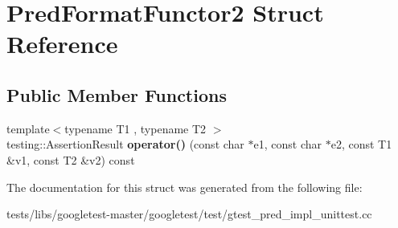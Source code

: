 \hypertarget{structPredFormatFunctor2}{}\section{Pred\+Format\+Functor2 Struct Reference}
\label{structPredFormatFunctor2}
\subsection*{Public Member Functions}
\begin{DoxyCompactItemize}
\item 
\mbox{\label{structPredFormatFunctor2_a0169e0105e15d5c63bece2a20646b22b}} 
{\footnotesize template$<$typename T1 , typename T2 $>$ }\\testing\+::\+Assertion\+Result {\bfseries operator()} (const char $\ast$e1, const char $\ast$e2, const T1 \&v1, const T2 \&v2) const
\end{DoxyCompactItemize}


The documentation for this struct was generated from the following file\+:\begin{DoxyCompactItemize}
\item 
tests/libs/googletest-\/master/googletest/test/gtest\+\_\+pred\+\_\+impl\+\_\+unittest.\+cc\end{DoxyCompactItemize}
